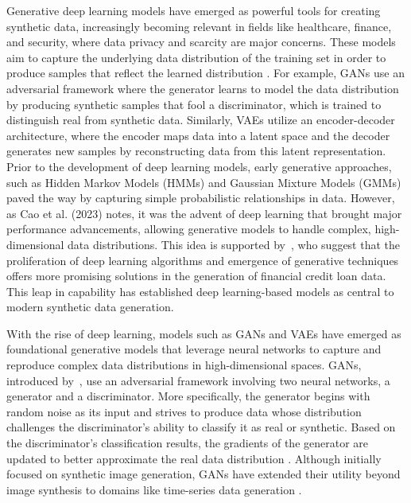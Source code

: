 \documentclass[11pt]{article}
\begin{document}
Generative deep learning models have emerged as powerful tools for creating synthetic data, increasingly becoming relevant in fields like healthcare, finance, and security, where data privacy and scarcity are major concerns. These models aim to capture the underlying data distribution of the training set in order to produce samples that reflect the learned distribution \parencite{carvajal-patino_synthetic_2022}. For example, GANs use an adversarial framework where the generator learns to model the data distribution by producing synthetic samples that fool a discriminator, which is trained to distinguish real from synthetic data. Similarly, VAEs utilize an encoder-decoder architecture, where the encoder maps data into a latent space and the decoder generates new samples by reconstructing data from this latent representation. Prior to the development of deep learning models, early generative approaches, such as Hidden Markov Models (HMMs) and Gaussian Mixture Models (GMMs) paved the way by capturing simple probabilistic relationships in data. However, as Cao et al. (2023) notes, it was the advent of deep learning that brought major performance advancements, allowing generative models to handle complex, high-dimensional data distributions. This idea is supported by~\textcite{caliskan_comparative_2023}, who suggest that the proliferation of deep learning algorithms and emergence of generative techniques offers more promising solutions in the generation of financial credit loan data. This leap in capability has established deep learning-based models as central to modern synthetic data generation. 

With the rise of deep learning, models such as GANs and VAEs have emerged as foundational generative models that leverage neural networks to capture and reproduce complex data distributions in high-dimensional spaces. GANs, introduced by~\textcite{goodfellow_generative_2014}, use an adversarial framework involving two neural networks, a generator and a discriminator. More specifically, the generator begins with random noise as its input and strives to produce data whose distribution challenges the discriminator’s ability to classify it as real or synthetic. Based on the discriminator’s classification results, the gradients of the generator are updated to better approximate the real data distribution \parencite{zia_synthetic_2023}. Although initially focused on synthetic image generation, GANs have extended their utility beyond image synthesis to domains like time-series data generation \parencite{yoon_time-series_2019}. 
\end{document}
